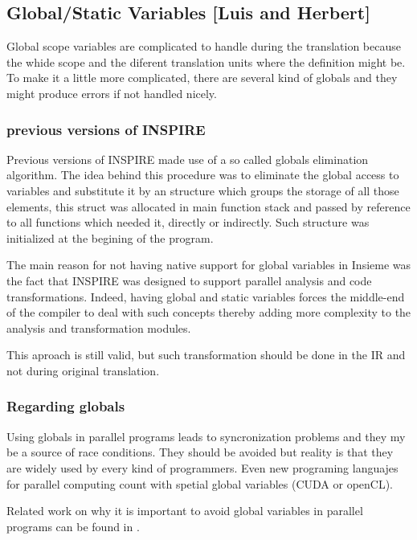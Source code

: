 \subsection{Global/Static Variables [Luis and Herbert]}
\label{sec:Insieme.Frontend.Global}

Global scope variables are complicated to handle during the translation because the whide scope and
the diferent translation units where the definition might be.\\
To make it a little more complicated, there are several kind of globals and they might produce
errors if not handled nicely.

\subsubsection{previous versions of INSPIRE}

Previous versions of INSPIRE made use of a so called globals elimination algorithm. The idea behind
this procedure was to eliminate the global access to variables and substitute it by an structure
which groups the storage of all those elements, this struct was allocated in main function stack and
passed by reference to all functions which needed it, directly or indirectly. 
Such structure was initialized at the begining of the program.

The main reason for not having native support for global variables in Insieme was
the fact that INSPIRE was designed to support parallel analysis and code
transformations. Indeed, having global and static variables forces the
middle-end of the compiler to deal with such concepts thereby adding more
complexity to the analysis and transformation modules.

This aproach is still valid, but such transformation should be done in the IR and not during
original translation.

\subsubsection{Regarding globals}

Using globals in parallel programs leads to syncronization problems and they my be a source of race
conditions. They should be avoided but reality is that they are widely used by every kind of
programmers. Even new programing languajes for parallel computing count with spetial global
variables (CUDA or openCL).

Related work on why it is important to avoid global variables in parallel programs can be found in
\cite{Zheng:2011:AHG:2117686.2118457}. 

